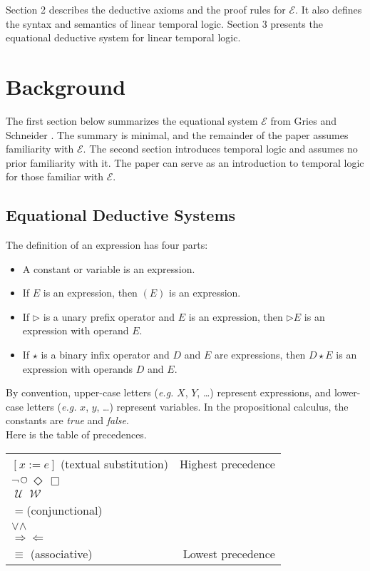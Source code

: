 \documentclass[fleqn, leqno]{article}
\newcommand{\llgap}{6pt}                            %
\newcommand{\impl}{\ensuremath{\Rightarrow}}        %
\newcommand{\foll}{\ensuremath{\Leftarrow}}         %
\newcommand{\Until}{\;\mathcal{U}\;}
\newcommand{\Wait}{\;\mathcal{W}\;}
\newcommand{\Next}{\;\,\text{\raisebox{3.5pt}{\circle{6}}}}
\newcommand{\Event}{\Diamond\,}
\newcommand{\Always}{\Box\,}
\begin{document}
Section 2 describes the deductive axioms and the proof rules for $\mathcal{E}$.
It also defines the syntax and semantics of linear temporal logic.
Section 3 presents the equational deductive system for linear temporal logic.\\

\section{Background}

The first section below summarizes the equational system $\mathcal{E}$ from Gries and Schneider \cite{LADM}.
The summary is minimal, and the remainder of the paper assumes familiarity with $\mathcal{E}$.
The second section introduces temporal logic and assumes no prior familiarity with it.
The paper can serve as an introduction to temporal logic for those familiar with $\mathcal{E}$.

\subsection{Equational Deductive Systems}

The definition of an expression has four parts:
\begin{itemize}[$\bullet$]
\item A constant or variable is an expression.
\item If $E$ is an expression, then $(E)$ is an expression.
\item If $\triangleright$ is a unary prefix operator and $E$ is an expression, then $\triangleright E$ is an expression with operand $E$.
\item If $\star$ is a binary infix operator and $D$ and $E$ are expressions, then $D \star E$ is an expression with operands $D$
and $E$.
\end{itemize}

By convention, upper-case letters ({\itshape e.g.\/} $X$, $Y$, \dots) represent expressions,
and lower-case letters ({\itshape e.g.\/} $x$, $y$, \dots) represent variables.
In the propositional calculus, the constants are {\itshape true\/} and {\itshape false\/}.\\

Here is the table of precedences.\\

\setlength\extrarowheight{2pt}
\begin{tabular}{lr}
\hline
$[x := e]$ (textual substitution) & Highest precedence\\
$\neg$\quad $\Next$\quad $\Event$\quad $\Always$ &\\
$\Until$\quad $\Wait$ &\\
$=$\quad (conjunctional) &\\
$\lor$\quad $\land$ &\\
$\impl$\quad $\foll$ &\\
$\equiv$ \quad (associative) & Lowest precedence\\
\hline
\end{tabular}\\[\llgap]
\end{document}
